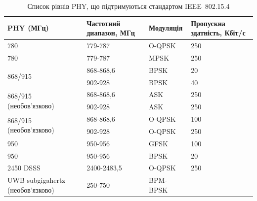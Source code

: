 \documentclass[a4paper,ukrainian,utf8,nocolumnsxix,floatsection,equationsection]{eskdtext}
\newcommand{\iee}[0]{IEEE~802.15.4\xspace}
\begin{document}
\begin{table}[htbp]
	\caption{Список рівнів PHY, що підтримуються стандартом \iee}
	\begin{tabular}{|p{}|p{}|p{}|p{}|}
		\hline
		PHY (МГц)                                 & Частотний диапазон, МГц      & Модуляція              & Пропускна здатність, Кбіт/с \\ \hline
		780                                       & 779-787                      & O-QPSK                 & 250                         \\ \hline
		780                                       & 779-787                      & MPSK                   & 250                         \\ \hline
		\multirow{2}{*}{868/915}                  & 868-868,6                    & BPSK                   & 20                          \\ \cline{ 2- 4}
		                                          & 902-928                      & BPSK                   & 40                          \\ \hline
		\multirow{2}{*}{868/915 (необов’язково)}  & 868-868,6                    & ASK                    & 250                         \\ \cline{ 2- 4}
		                                          & 902-928                      & ASK                    & 250                         \\ \hline
		\multirow{2}{*}{868/915 (необов’язково)}  & 868-868,6                    & O-QPSK                 & 100                         \\ \cline{ 2- 4}
		                                          & 902-928                      & O-QPSK                 & 250                         \\ \hline
		950                                       & 950-956                      & GFSK                   & 100                         \\ \hline
		950                                       & 950-956                      & BPSK                   & 20                          \\ \hline
		2450 DSSS                                 & 2400-2483,5                  & O-QPSK                 & 250                         \\ \hline
		UWB subgigahertz (необов’язково)          & 250-750                      & BPM-BPSK               &                             \\ \hline

\end{tabular}
\end{table}
\end{document}
